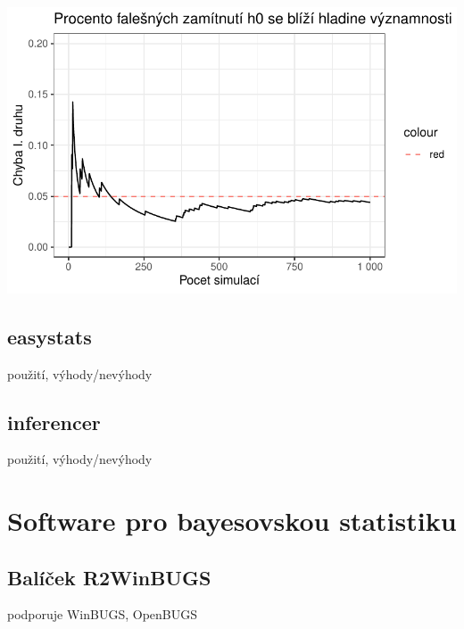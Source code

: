 \documentclass[
  11pt,
  a4paper]{report}
\begin{document}
\includegraphics{index_files/figure-pdf/unnamed-chunk-4-1.pdf}

\subsection{easystats}\label{easystats}

použití, výhody/nevýhody

\subsection{inferencer}\label{inferencer}

použití, výhody/nevýhody

\section{Software pro bayesovskou
statistiku}\label{software-pro-bayesovskou-statistiku}

\subsection{Balíček R2WinBUGS}\label{baluxedux10dek-r2winbugs}

podporuje WinBUGS, OpenBUGS
\end{document}
